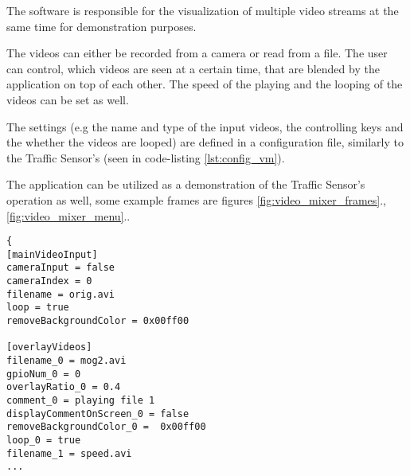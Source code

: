 The software is responsible for the visualization of multiple video streams at the same time for demonstration purposes.

The videos can either be recorded from a camera or read from a file.
The user can control, which videos are seen at a certain time, that are blended by the application on top of each other.
The speed of the playing and the looping of the videos can be set as well.

The settings (e.g the name and type of the input videos, the controlling keys and the whether the videos are looped) are defined in a configuration file, similarly to the Traffic Sensor's (seen in code-listing \ref{lst:config_vm}).

The application can be utilized as a demonstration of the Traffic Sensor's operation as well, some example frames are figures \ref{fig:video_mixer_frames}., \ref{fig:video_mixer_menu}..

\begin{lstlisting}[frame=single,float=!ht,caption={Part of a configuration file for the VideoMixer application. The file sets parameters for the main input video (section [mainVideoInput]), and the overlay videos (section [overlayVideos]), that are blended on top. The file defines whether the video is read from a camera or a file, whether some parts of the background are removed, and other adjustments, like the comment displayed on the screen, when a video starts playing.},label=lst:config_vm]
{
[mainVideoInput]
cameraInput = false
cameraIndex = 0
filename = orig.avi
loop = true
removeBackgroundColor = 0x00ff00

[overlayVideos]
filename_0 = mog2.avi
gpioNum_0 = 0
overlayRatio_0 = 0.4
comment_0 = playing file 1
displayCommentOnScreen_0 = false
removeBackgroundColor_0 =  0x00ff00
loop_0 = true
filename_1 = speed.avi
...
\end{lstlisting}

